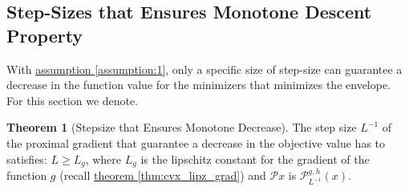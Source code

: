 \documentclass[]{article}
\theoremstyle{definition}
\newtheorem{theorem}{Theorem}       %
\begin{document}
    \subsection{Step-Sizes that Ensures Monotone Descent Property}
        With \hyperref[assumption:1]{assumption \ref*{assumption:1}}, only a specific size of step-size can guarantee a decrease in the function value for the minimizers that minimizes the envelope. For this section we denote. 
        \begin{theorem}[Stepsize that Ensures Monotone Decrease]\label{thm:monotone_decrease}
            The step size $L^{-1}$ of the proximal gradient that guarantee a decrease in the objective value has to satisfies: $L \ge L_g$, where $L_g$ is the lipschitz constant for the gradient of the function $g$ (recall \hyperref[thm:cvx_lipz_grad]{theorem \ref*{thm:cvx_lipz_grad}}) and $\mathcal Px$ is $\mathcal P_{L^{-1}}^{g, h}(x)$. 
        \end{theorem}
\end{document}
